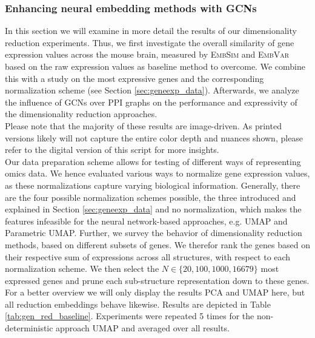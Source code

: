 \documentclass[]{article}
\begin{document}
\subsubsection{Enhancing neural embedding methods with GCNs}
\label{sec:results_dim_GCN}
In this section we will examine in more detail the results of our dimensionality reduction experiments. 
Thus, we first investigate the overall similarity of gene expression values across the mouse brain, measured by \textsc{EmbSim} and \textsc{EmbVar} based on the raw expression values as baseline method to overcome. We combine this with a study on the most expressive genes and the corresponding normalization scheme (see Section \ref{sec:geneexp_data}). Afterwards, we  analyze the influence of GCNs over PPI graphs on the performance and expressivity of the dimensionality reduction approaches.\\

Please note that the majority of these results are image-driven. As printed versions likely will not capture the entire color depth and nuances shown, please refer to the digital version of this script for more insights.\\

Our data preparation scheme allows for testing of different ways of representing omics data. We hence evaluated various ways to normalize gene expression values, as these normalizations capture varying biological information. Generally, there are the four possible normalization schemes possible, the three introduced and explained in Section \ref{sec:geneexp_data} and no normalization, which makes the features infeasible for the neural network-based approaches, e.g. UMAP and Parametric UMAP.
Further, we survey the behavior of dimensionality reduction methods, based on different subsets of genes. We therefor rank the genes based on their respective sum of expressions across all structures, with respect to each normalization scheme. We then select the $N\in \{20, 100, 1000, 16679\}$ most expressed genes and prune each sub-structure representation down to these genes. For a better overview we will only display the results PCA and UMAP here, but all reduction embeddings behave likewise. Results are depicted in Table \ref{tab:gen_red_baseline}. Experiments were repeated 5 times for the non-deterministic approach UMAP and averaged over all results.\\
\end{document}
